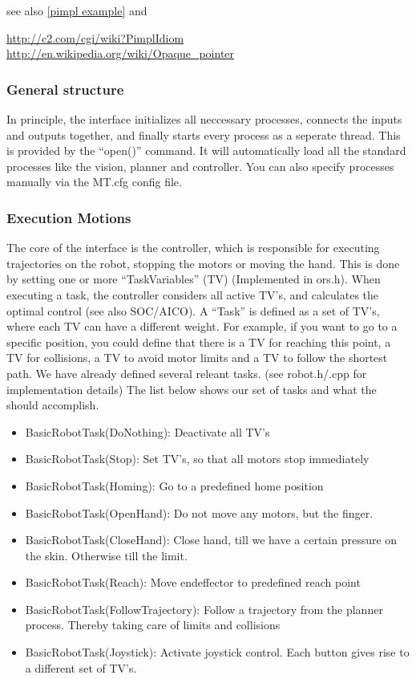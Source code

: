 see also \ref{pimpl example} and  

\url{http://c2.com/cgi/wiki?PimplIdiom}\newline
\url{http://en.wikipedia.org/wiki/Opaque_pointer}
\subsubsection{General structure}
In principle, the interface initializes all neccessary processes, connects
the inputs and outputs together, and finally starts every process as a seperate
thread. This is provided by the ``open()'' command. It will automatically load
all the standard processes like the vision, planner and controller. You can also 
specify processes manually via the MT.cfg config file. 
\subsubsection{Execution Motions}
The core of the interface is the controller, which is responsible for
executing trajectories on the robot, stopping the motors or moving the hand.
This is done by setting one or more ``TaskVariables'' (TV) (Implemented in ors.h).
When executing a task, the controller considers all active TV's, and calculates
the optimal control (see also SOC/AICO). A ``Task'' is defined as a set of TV's,
where each TV can have a different weight. For example, if you want to go to a
specific position, you could define that there is a TV for reaching this point, a TV for collisions, a
TV to avoid motor limits and a TV to follow the shortest path. We have already
defined several releant tasks. (see robot.h/.cpp for
implementation details) The list below shows our set of tasks and what the
should accomplish. 
\begin{itemize}
\item BasicRobotTask(DoNothing): Deactivate all TV's
\item BasicRobotTask(Stop): Set TV's, so that all motors stop immediately
\item BasicRobotTask(Homing): Go to a predefined home position
\item BasicRobotTask(OpenHand): Do not move any motors, but the finger.
\item BasicRobotTask(CloseHand): Close hand, till we have a certain pressure on
  the skin. Otherwise till the limit.
\item BasicRobotTask(Reach): Move endeffector to predefined reach point
\item BasicRobotTask(FollowTrajectory): Follow a trajectory from the planner
  process. Thereby taking care of limits and collisions
\item BasicRobotTask(Joystick): Activate joystick control. Each button gives
  rise to a different set of TV's.
\end{itemize}


